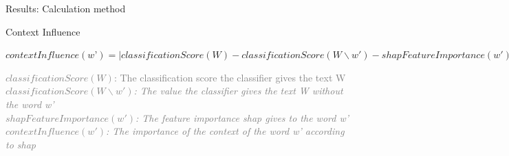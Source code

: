 \documentclass[en]{sdqbeamer}
\begin{document}
\begin{large}
\begin{frame}{Results: Calculation method}
\begin{exampleblock}{Context Influence}
\begin{center}
$contextInfluence(w’) = | classificationScore(W) - classificationScore(W\backslash w') - shapFeatureImportance(w') |$
\end{center}
\end{exampleblock}
\vspace{1cm}
\textcolor{gray}{
$classificationScore(W)$: The classification score the classifier gives the text W\\
\textit{$classificationScore(W \backslash w')$: The value the classifier gives the text W without the word w'}\\
\textit{$shapFeatureImportance(w')$: The feature importance shap gives to the word w'}\\
\textit{$contextInfluence(w')$: The importance of the context of the word w' according to shap}}
\end{frame}


\end{large}
\end{document}
